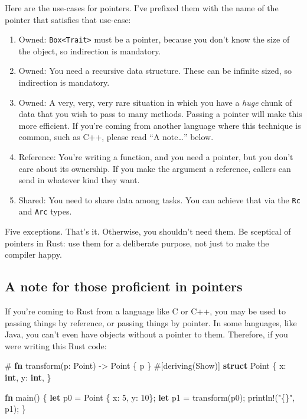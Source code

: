 \documentclass[]{article}
\newenvironment{Shaded}{}{}
\newcommand{\KeywordTok}[1]{\textcolor[rgb]{0.00,0.44,0.13}{\textbf{{#1}}}}
\newcommand{\DecValTok}[1]{\textcolor[rgb]{0.25,0.63,0.44}{{#1}}}
\newcommand{\StringTok}[1]{\textcolor[rgb]{0.25,0.44,0.63}{{#1}}}
\newcommand{\OtherTok}[1]{\textcolor[rgb]{0.00,0.44,0.13}{{#1}}}
\newcommand{\NormalTok}[1]{{#1}}
\begin{document}
Here are the use-cases for pointers. I've prefixed them with the name of
the pointer that satisfies that use-case:

\begin{enumerate}
\def\labelenumi{\arabic{enumi}.}
\item
  Owned: \texttt{Box\textless{}Trait\textgreater{}} must be a pointer,
  because you don't know the size of the object, so indirection is
  mandatory.
\item
  Owned: You need a recursive data structure. These can be infinite
  sized, so indirection is mandatory.
\item
  Owned: A very, very, very rare situation in which you have a
  \emph{huge} chunk of data that you wish to pass to many methods.
  Passing a pointer will make this more efficient. If you're coming from
  another language where this technique is common, such as C++, please
  read ``A note\ldots{}'' below.
\item
  Reference: You're writing a function, and you need a pointer, but you
  don't care about its ownership. If you make the argument a reference,
  callers can send in whatever kind they want.
\item
  Shared: You need to share data among tasks. You can achieve that via
  the \texttt{Rc} and \texttt{Arc} types.
\end{enumerate}

Five exceptions. That's it. Otherwise, you shouldn't need them. Be
sceptical of pointers in Rust: use them for a deliberate purpose, not
just to make the compiler happy.

\subsection{A note for those proficient in
pointers}\label{a-note-for-those-proficient-in-pointers}

If you're coming to Rust from a language like C or C++, you may be used
to passing things by reference, or passing things by pointer. In some
languages, like Java, you can't even have objects without a pointer to
them. Therefore, if you were writing this Rust code:

\begin{Shaded}
\begin{Highlighting}[]
\NormalTok{# }\KeywordTok{fn} \NormalTok{transform(p: Point) -> Point \{ p \}}
\OtherTok{#[}\NormalTok{deriving}\OtherTok{(}\NormalTok{Show}\OtherTok{)]}
\KeywordTok{struct} \NormalTok{Point \{}
    \NormalTok{x: }\KeywordTok{int}\NormalTok{,}
    \NormalTok{y: }\KeywordTok{int}\NormalTok{,}
\NormalTok{\}}

\KeywordTok{fn} \NormalTok{main() \{}
    \KeywordTok{let} \NormalTok{p0 = Point \{ x: }\DecValTok{5}\NormalTok{, y: }\DecValTok{10}\NormalTok{\};}
    \KeywordTok{let} \NormalTok{p1 = transform(p0);}
    \OtherTok{println!}\NormalTok{(}\StringTok{"\{\}"}\NormalTok{, p1);}
\NormalTok{\}}
\end{Highlighting}
\end{Shaded}
\end{document}
